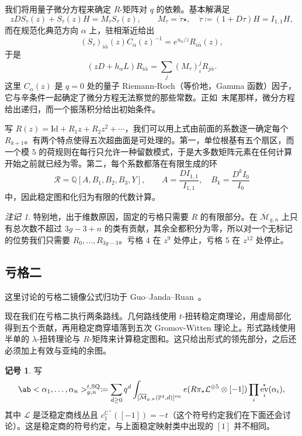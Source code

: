 \documentclass{amsart}
\theoremstyle{definition}
\newtheorem{notn}[thm]{记号}
\theoremstyle{remark}
\newtheorem{rmk}[thm]{注记}
\theoremstyle{plain}
\theoremstyle{definition}
\theoremstyle{remark}
\newcommand{\C}{\mathbb{C}}
\newcommand{\Q}{\mathbb{Q}}
\renewcommand{\P}{\mathbb{P}}
\newcommand{\Mbar}{\overline{\mathcal{M}}}
\newcommand{\mc}[1]{\mathcal{#1}}
\newcommand{\mr}[1]{\mathrm{#1}}
\newcommand{\1}{\mathbf{1}}
\newcommand{\2}{\mathbf{2}}
\newcommand{\3}{\mathbf{3}}
\newcommand{\vir}{\mr{vir}}
\DeclareMathOperator{\ev}{ev}
\begin{document}
我们将用量子微分方程来确定 \(R\)-矩阵对 \(q\) 的依赖。基本解满足
\[ zDS_{\tau}(z) + S_{\tau}(z)H = M_{\tau}S_{\tau}(z), \qquad M_{\tau} = \dot{\tau}\star, \quad \dot{\tau} \coloneqq (1+D\tau)H = I_{1,1}H, \]
而在规范化典范方向 \(\alpha\) 上，驻相渐近给出
\[ (S_{\tau})_{i\bar{\alpha}}(z)C_{\alpha}(z)^{-1} = e^{u_{\alpha}/z}R_{i\bar{\alpha}}(z), \]
于是
\[ (zD+h_{\alpha}L)R_{i\bar{\alpha}} = \sum_j (M_{\tau})_i^j R_{j\bar{\alpha}}. \]
这里 \(C_{\alpha}(z)\) 是 \(q=0\) 处的量子 Riemann-Roch（等价地，Gamma 函数）因子，它与辛条件一起确定了微分方程无法察觉的那些常数。正如~末尾那样，微分方程给出递归，而一个振荡积分给出初始条件。

写 \(R(z) = \mr{Id} + R_1 z + R_2 z^2 + \cdots\)，我们可以用上式由前面的系数逐一确定每个 \(R_{k+1}\)。有两个特点使得五次超曲面是可处理的。第一，单位根基有五个扇区，而一个模 \(5\) 的荷规则在每行只允许一种留数模式，于是大多数矩阵元素在任何计算开始之前就已经为零。第二，每个系数都落在有限生成的环
\[ \mc{R} = \Q[A,B_1,B_2,B_3,Y], \qquad A = \frac{DI_{1,1}}{I_{1,1}}, \quad B_k = \frac{D^k I_0}{I_0} \]
中，因此稳定图和化归为有限的代数计算。

\begin{rmk}
    特别地，出于维数原因，固定的亏格只需要 \(R\) 的有限部分。在 \(\Mbar_{g,n}\) 上只有总次数不超过 \(3g-3+n\) 的类有贡献，其余全都积分为零，所以对一个无标记的位势我们只需要 \(R_0, \ldots, R_{3g-3}\)。亏格 \(4\) 在 \(z^9\) 处停止，亏格 \(5\) 在 \(z^{12}\) 处停止。
\end{rmk}

\subsection{亏格二}%
\label{sub:Genus two}

这里讨论的亏格二镜像公式归功于 Guo--Janda--Ruan~\cite{GJRgenus2}。

现在我们在亏格二执行两条路线。几何路线使用 \(t\)-扭转稳定商理论，用虚局部化得到五个贡献，再用稳定商穿墙落到五次 Gromov-Witten 理论上。形式路线使用半单的 \(\lambda\)-扭转理论与 \(R\)-矩阵来计算稳定图和。这只给出形式的领先部分，之后还必须加上有效与亚纯的余图。

\begin{notn}
    写
    \[ \ab<\alpha_1, \ldots, \alpha_n>^{t,\mr{SQ}}_{g,n} \coloneqq \sum_{d\geq0}q^d \int_{[\Mbar_{g,n}(\P^4,d)]^{\vir}}e(R\pi_*\mc{L}^{\otimes 5}\otimes[-1])\prod_i \ev_i^*(\alpha_i), \]
    其中 \(\mc{L}\) 是泛稳定商线丛且 \(c_1^{\C^{\times}}([-1]) = -t\)（这个符号约定我们在下面还会讨论）。这是稳定商的符号约定，与上面稳定映射类中出现的 \([1]\) 并不相同。
\end{notn}
\end{document}
